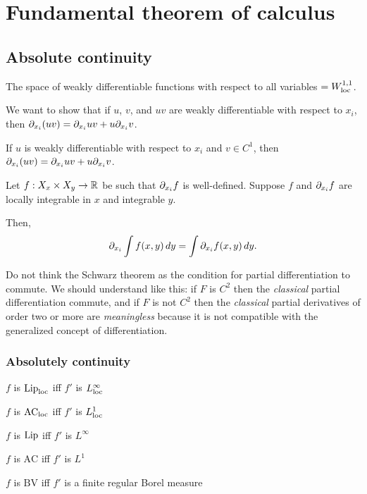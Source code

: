 \documentclass{../../large}
\begin{document}
\part{Fundamental theorem of calculus}

\chapter{Absolute continuity}

The space of weakly differentiable functions with respect to all variables $=W_{\mathrm{loc}}^{1,1}$.

\begin{prb}
We want to show that if $u$, $v$, and $uv$ are weakly differentiable with respect to $x_i$, then $\pd_{x_i}(uv)=\pd_{x_i}uv+u\pd_{x_i}v$.
\begin{parts}
\item If $u$ is weakly differentiable with respect to $x_i$ and $v\in C^1$, then $\pd_{x_i}(uv)=\pd_{x_i}uv+u\pd_{x_i}v$.
\end{parts}
\end{prb}


\begin{prb}
Let $f:X_x\times X_y\to\mathbb{R}$ be such that $\pd_{x_i}f$ is well-defined. Suppose $f$ and $\pd_{x_i}f$ are locally integrable in $x$ and integrable $y$.

Then,
\[\pd_{x_i}\int f(x,y)\,dy=\int\pd_{x_i}f(x,y)\,dy.\]
\end{prb}


Do not think the Schwarz theorem as the condition for partial differentiation to commute.
We should understand like this: if $F$ is $C^2$ then the \emph{classical} partial differentiation commute, and if $F$ is not $C^2$ then the \emph{classical} partial derivatives of order two or more are \emph{meaningless} because it is not compatible with the generalized concept of differentiation.



\section{Absolutely continuity}

\begin{parts}
\item $f$ is $\operatorname{Lip}_{\mathrm{loc}}$ iff $f'$ is $L_{\mathrm{loc}}^\infty$
\item $f$ is $\textrm{AC}_{\mathrm{loc}}$ iff $f'$ is $L_{\mathrm{loc}}^1$
\end{parts}
\begin{parts}
\item $f$ is $\operatorname{Lip}$ iff $f'$ is $L^\infty$
\item $f$ is $\textrm{AC}$ iff $f'$ is $L^1$
\item $f$ is $\textrm{BV}$ iff $f'$ is a finite regular Borel measure
\end{parts}
\end{document}
